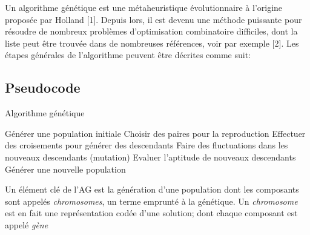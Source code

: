 \documentclass{article}
\begin{document}
Un algorithme génétique est une métaheuristique évolutionnaire à l'origine proposée par Holland [1]. Depuis lors, il est devenu une méthode puissante pour résoudre de nombreux problèmes d'optimisation combinatoire difficiles, dont la liste peut être trouvée dans de nombreuses références, voir par exemple [2]. Les étapes générales de l'algorithme peuvent être décrites comme suit:
\newline
\subsection{Pseudocode}
\begin{algorithm}[H]
	\caption{Algorithme génétique}
	\begin{algorithmic}
		\STATE Générer une population initiale\;
			\STATE Choisir des paires pour la reproduction\;
			\STATE Effectuer des croisements pour générer des descendants\;
			\STATE Faire des fluctuations dans les nouveaux descendants (mutation)\;
			\STATE Evaluer l'aptitude de nouveaux descendants\;
			\STATE Générer une nouvelle population\;
		\ENDWHILE
	\end{algorithmic}
\end{algorithm}

Un élément clé de l'AG est la génération d'une population dont les composants sont appelés \textit{chromosomes}, un terme emprunté à la génétique. Un \textit{chromosome} est en fait une représentation codée d'une solution; dont chaque composant est appelé \textit{gène}
\end{document}
